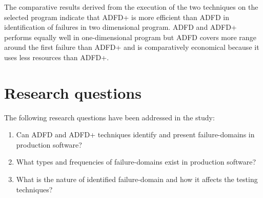 The comparative results derived from the execution of the two techniques on the selected program indicate that ADFD+ is more efficient than ADFD in identification of failures in two dimensional program. ADFD and ADFD+ performs equally well in one-dimensional program but ADFD covers more range around the first failure than ADFD+ and is comparatively economical because it uses less resources than ADFD+.


\section{Research questions} \label{sec:questions}
The following research questions have been addressed in the study:
\begin{enumerate}
%
\item Can ADFD and ADFD+ techniques identify and present failure-domains in production software? %

%
%
\item What types and frequencies of failure-domains exist in production software? %
%
\item What is the nature of identified failure-domain and how it affects the testing techniques? %


\end{enumerate}
